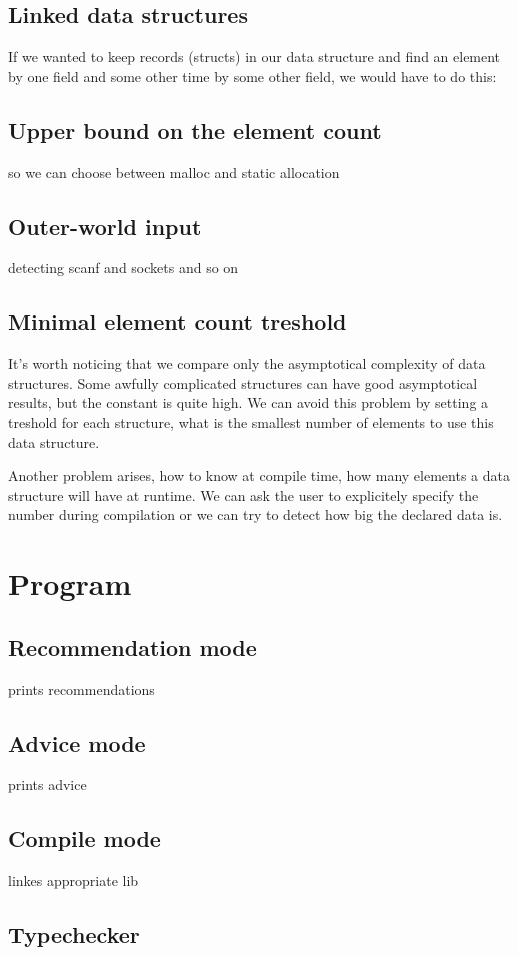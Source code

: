 \documentclass[11pt]{article}
\begin{document}
	\subsection{Linked data structures}
		If we wanted to keep records (structs) in our data structure and find an element by one field and some other time by some other field, we would have to do this:
	\subsection{Upper bound on the element count}
		so we can choose between malloc and static allocation
	\subsection{Outer-world input}
		detecting scanf and sockets and so on
	\subsection{Minimal element count treshold}
		It's worth noticing that we compare only the asymptotical complexity of data structures. Some awfully complicated structures can have good asymptotical results, but the constant is quite high. We can avoid this problem by setting a treshold for each structure, what is the smallest number of elements to use this data structure.

		Another problem arises, how to know at compile time, how many elements a data structure will have at runtime. We can ask the user to explicitely specify the number during compilation or we can try to detect how big the declared data is.
\section{Program}
	\subsection{Recommendation mode}
		prints recommendations
	\subsection{Advice mode}
		prints advice
	\subsection{Compile mode}
		linkes appropriate lib
	\subsection{Typechecker}
\end{document}
